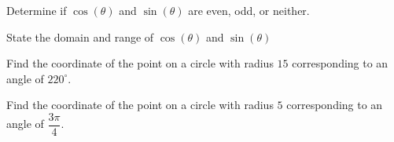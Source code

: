 \documentclass[../mathNotesPreamble]{subfiles}
\begin{document}
  \begin{ex*}
    Determine if $\cos(\theta)$ and $\sin(\theta)$ are even, odd, or neither.
  \end{ex*}
  \begin{ex*}
    State the domain and range of $\cos(\theta)$ and $\sin(\theta)$
  \end{ex*}
  \pagebreak

  \begin{ex*}
    Find the coordinate of the point on a circle with radius $15$ corresponding to an angle of $220^\circ$.
  \end{ex*}
  \begin{ex*}
    Find the coordinate of the point on a circle with radius $5$ corresponding to an angle of $\dfrac{3\pi}{4}$.
  \end{ex*}
  \pagebreak
\end{document}
